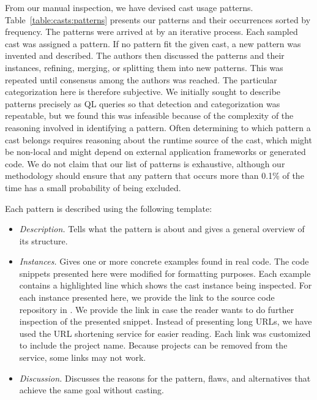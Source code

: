 From our manual inspection,
we have devised \nPattern{} cast usage patterns.
Table~\ref{table:casts:patterns} presents our patterns and their occurrences sorted by frequency.
%
%
The patterns were arrived at by an iterative process. Each sampled cast was
assigned a pattern. If no pattern fit the given cast, a new pattern was
invented and described.
The authors then discussed the patterns and their instances, refining,
merging, or splitting them into new patterns. This was repeated until
consensus among the authors was reached.
The particular categorization here is therefore subjective.
%
We initially sought to describe patterns precisely as QL queries so that
detection and categorization was repeatable, but we found
this was infeasible because of the complexity of the reasoning involved in
identifying a pattern. Often determining to which pattern a cast belongs
requires reasoning about the runtime source of the cast, which might be
non-local and might depend on external application frameworks or generated
code.
%
We do not claim that our list of patterns is exhaustive, although our
methodology should ensure that any pattern that occurs more than 0.1\% of the
time has a small probability of being excluded.

Each pattern is described using the following template:

\begin{itemize}
\item \textit{Description.}
Tells what the pattern is about and gives a general overview of its structure.

\item \textit{Instances.}
Gives one or more concrete examples found in real code.
The code snippets presented here were modified for formatting purposes.
Each example contains a highlighted line which shows the cast instance being inspected.
For each instance presented here, we provide the link to the source code repository in \lgtm{}.
We provide the link in case the reader wants to do further inspection
of the presented snippet.
Instead of presenting long \lgtm{} URLs,
we have used the URL shortening service
\href{https://bitly.com/}{\bitly} for easier reading.
Each \bitly{} link was customized to include the project name.
Because projects can be removed from the \lgtm{} service,
some links may not work.

\item \textit{Discussion.}
  Discusses the reasons for the pattern, flaws, and alternatives
    that achieve the same goal without casting.

\end{itemize}


